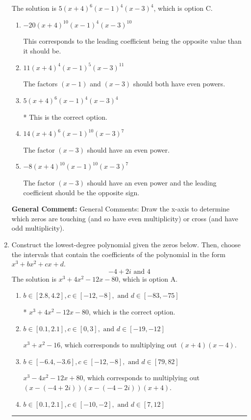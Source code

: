 \documentclass{extbook}[14pt]
\newcommand{\litem}[1]{\item #1

\rule{\textwidth}{0.4pt}}
\begin{document}
\begin{enumerate}
{The solution is \( 5(x + 4)^{6} (x - 1)^{4} (x - 3)^{4} \), which is option C.\begin{enumerate}[label=\Alph*.]
\item \( -20(x + 4)^{10} (x - 1)^{4} (x - 3)^{10} \)

This corresponds to the leading coefficient being the opposite value than it should be.
\item \( 11(x + 4)^{4} (x - 1)^{5} (x - 3)^{11} \)

The factors $(x - 1)$ and $(x - 3)$ should both have even powers.
\item \( 5(x + 4)^{6} (x - 1)^{4} (x - 3)^{4} \)

* This is the correct option.
\item \( 14(x + 4)^{6} (x - 1)^{10} (x - 3)^{7} \)

The factor $(x - 3)$ should have an even power.
\item \( -8(x + 4)^{10} (x - 1)^{10} (x - 3)^{7} \)

The factor $(x - 3)$ should have an even power and the leading coefficient should be the opposite sign.
\end{enumerate}

\textbf{General Comment:} General Comments: Draw the x-axis to determine which zeros are touching (and so have even multiplicity) or cross (and have odd multiplicity).
}
\litem{
Construct the lowest-degree polynomial given the zeros below. Then, choose the intervals that contain the coefficients of the polynomial in the form $x^3+bx^2+cx+d$.
\[ -4 + 2 i \text{ and } 4 \]The solution is \( x^{3} +4 x^{2} -12 x -80 \), which is option A.\begin{enumerate}[label=\Alph*.]
\item \( b \in [2.8, 4.2], c \in [-12, -8], \text{ and } d \in [-83, -75] \)

* $x^{3} +4 x^{2} -12 x -80$, which is the correct option.
\item \( b \in [0.1, 2.1], c \in [0, 3], \text{ and } d \in [-19, -12] \)

$x^{3} + x^{2} -16$, which corresponds to multiplying out $(x + 4)(x -4)$.
\item \( b \in [-6.4, -3.6], c \in [-12, -8], \text{ and } d \in [79, 82] \)

$x^{3} -4 x^{2} -12 x + 80$, which corresponds to multiplying out $(x-(-4 + 2 i))(x-(-4 - 2 i))(x + 4)$.
\item \( b \in [0.1, 2.1], c \in [-10, -2], \text{ and } d \in [7, 12] \)


\end{enumerate}}
\end{enumerate}
\end{document}
